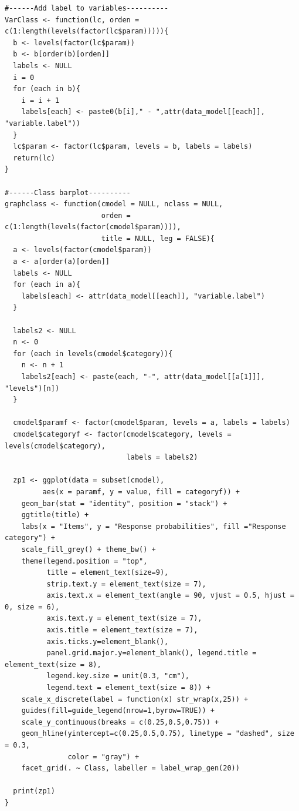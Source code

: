 \documentclass[12pt,a4paper,oneside]{reedthesis}
\begin{document}
\begin{verbatim}
#------Add label to variables----------
VarClass <- function(lc, orden = c(1:length(levels(factor(lc$param))))){
  b <- levels(factor(lc$param))
  b <- b[order(b)[orden]]
  labels <- NULL
  i = 0
  for (each in b){
    i = i + 1
    labels[each] <- paste0(b[i]," - ",attr(data_model[[each]], "variable.label"))
  }
  lc$param <- factor(lc$param, levels = b, labels = labels)
  return(lc)
}

#------Class barplot----------
graphclass <- function(cmodel = NULL, nclass = NULL, 
                       orden = c(1:length(levels(factor(cmodel$param)))), 
                       title = NULL, leg = FALSE){
  a <- levels(factor(cmodel$param))
  a <- a[order(a)[orden]]
  labels <- NULL
  for (each in a){
    labels[each] <- attr(data_model[[each]], "variable.label")
  }
  
  labels2 <- NULL
  n <- 0
  for (each in levels(cmodel$category)){
    n <- n + 1
    labels2[each] <- paste(each, "-", attr(data_model[[a[1]]], "levels")[n])
  }
  
  cmodel$paramf <- factor(cmodel$param, levels = a, labels = labels)
  cmodel$categoryf <- factor(cmodel$category, levels = levels(cmodel$category), 
                             labels = labels2)
  
  zp1 <- ggplot(data = subset(cmodel),
         aes(x = paramf, y = value, fill = categoryf)) + 
    geom_bar(stat = "identity", position = "stack") + 
    ggtitle(title) +
    labs(x = "Items", y = "Response probabilities", fill ="Response category") +
    scale_fill_grey() + theme_bw() +
    theme(legend.position = "top", 
          title = element_text(size=9),
          strip.text.y = element_text(size = 7), 
          axis.text.x = element_text(angle = 90, vjust = 0.5, hjust = 0, size = 6),
          axis.text.y = element_text(size = 7),
          axis.title = element_text(size = 7),
          axis.ticks.y=element_blank(),         
          panel.grid.major.y=element_blank(), legend.title = element_text(size = 8), 
          legend.key.size = unit(0.3, "cm"),
          legend.text = element_text(size = 8)) +
    scale_x_discrete(label = function(x) str_wrap(x,25)) +
    guides(fill=guide_legend(nrow=1,byrow=TRUE)) +
    scale_y_continuous(breaks = c(0.25,0.5,0.75)) +
    geom_hline(yintercept=c(0.25,0.5,0.75), linetype = "dashed", size = 0.3, 
               color = "gray") +
    facet_grid(. ~ Class, labeller = label_wrap_gen(20)) 
  
  print(zp1)
}


\end{verbatim}
\end{document}
